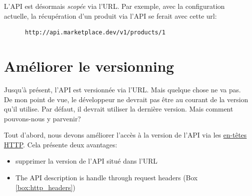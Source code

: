 \documentclass[]{report}
\begin{document}
    L'API est désormais \textit{scopée} via l'URL. Par exemple, avec la configuration actuelle, la récupération d'un produit via l'API se ferait avec cette url:

    \begin{scriptsize}
      \begin{lstlisting}
      http://api.marketplace.dev/v1/products/1
      \end{lstlisting}
    \end{scriptsize}

  \section{Améliorer le versionning}\label{section:improve_api_versioning}

    Jusqu'à présent, l'API est versionnée via l'URL. Mais quelque chose ne va pas. De mon point de vue, le développeur ne devrait pas être au courant de la version qu'il utilise. Par défaut, il devrait utiliser la dernière version. Mais comment pouvons-nous y parvenir?

    Tout d'abord, nous devons améliorer l'accès à la version de l'API via les \href{http://en.wikipedia.org/wiki/List_of_HTTP_header_fields}{en-têtes HTTP}. Cela présente deux avantages:

    \begin{itemize}
      \item supprimer la version de l'API situé dans l'URL
      \item The API description is handle through request headers (Box \ref{box:http_headers})
    \end{itemize}
\end{document}
